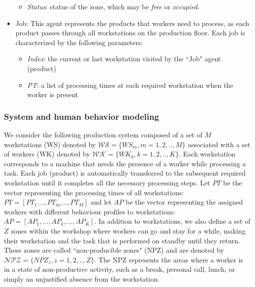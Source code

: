 \documentclass[review,12pt, 3p, times]{elsarticle}
\begin{document}
\begin{itemize}
\begin{itemize}
        \item\textit{Status}: status of the zone, which may be \textit{free} or \textit{occupied}. 
    \end{itemize}
    \item Job: This agent represents the products that workers need to process, as each product passes through all workstations on the production floor. Each job is characterized by the following parameters:
    \begin{itemize}
        \item\textit{Index}: the current or last workstation visited by the “Job" agent (product)
	\item\textit{PT}: a list of processing times at each required workstation when the worker is present
    \end{itemize}
\end{itemize}
			      			
\begin{figure}[htbp]
	
	
	\label{fig:interaction}
\end{figure}
	
\subsubsection{System and human behavior modeling}
We consider the following production system composed of a set of $M$ workstations (WS) denoted by $\mathcal{W\!S}=\{W\!S_m, m=1,2,..,M\}$ associated with a set of workers (WK) denoted by $\mathcal{W\!K}=\{W\!K_k, k=1,2,..,K\}$.
Each workstation corresponds to a machine that needs the presence of a worker while processing a task. Each job (product) is automatically transferred to the subsequent required workstation until it completes all the necessary processing steps. Let $PT$ be the vector representing the processing times of all workstations:  
$PT=[PT_1,.., PT_m,.., PT_M]$  and let $AP$ be the vector representing the assigned workers with different behaviour profiles to workstations: $AP=[AP_1, ..., AP_k, ..., AP_K]$. 
In addition to workstations, we also define a set of $Z$ zones within the workshop where workers can go and stay for a while, making their workstation and the task that is performed on standby until they return. These zones are called “non-producible zones" (NPZ) and are denoted by $\mathcal{NPZ}=\{N\!P\!Z_z, z=1,2,..,Z\}$. The NPZ represents the areas where a worker is in a state of non-productive activity, such as a break, personal call, lunch, or simply an unjustified absence from the workstation.
\end{document}
